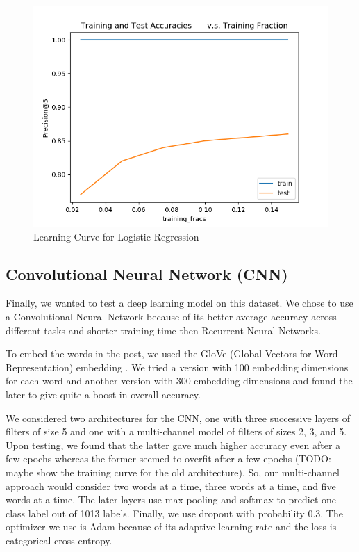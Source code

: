 \documentclass{sig-alternate-05-2015}
\begin{document}
\begin{figure}[H]
\centering
\includegraphics[width=\linewidth]{plots/learning_curve_lr.png}
\caption{Learning Curve for Logistic Regression}
\end{figure}

\subsection{Convolutional Neural Network (CNN)}

Finally, we wanted to test a deep learning model on this dataset. We chose to use a Convolutional Neural Network because of its better average accuracy across different tasks and shorter training time then Recurrent Neural Networks.

To embed the words in the post, we used the GloVe (Global Vectors for Word Representation) embedding \cite{pennington2014glove}. We tried a version with 100 embedding dimensions for each word and another version with 300 embedding dimensions and found the later to give quite a boost in overall accuracy.

We considered two architectures for the CNN, one with three successive layers of filters of size 5 and one with a multi-channel model of filters of sizes 2, 3, and 5. Upon testing, we found that the latter gave much higher accuracy even after a few epochs whereas the former seemed to overfit after a few epochs (TODO: maybe show the training curve for the old architecture). So, our multi-channel approach would consider two words at a time, three words at a time, and five words at a time. The later layers use max-pooling and softmax to predict one class label out of 1013 labels. Finally, we use dropout with probability 0.3. The optimizer we use is Adam because of its adaptive learning rate and the loss is categorical cross-entropy.
\end{document}
